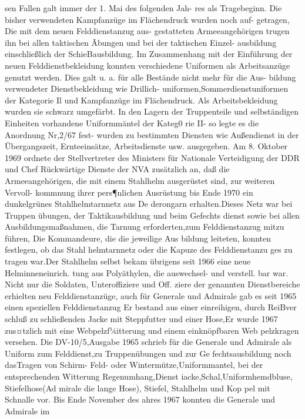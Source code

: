 sen Fallen galt immer der 1. Mai des folgenden Jah-
res als Tragebeginn. Die bisher verwendeten
Kampfanzüge im Flächendruck wurden noch auf-
getragen, Die mit dem neuen Felddienstanzug aus-
gestatteten Armeeangehörigen trugen ihn bei allen
taktischen Ãbungen und bei der taktischen Einzel-
ausbildung einschließlich der SchieBausbildung.
Im Zusammenhang mit der Einführung der
neuen Felddienstbekleidung konnten verschiedene
Uniformen als Arbeitsanzüge genutzt werden. Dies
galt u. a. für alle Bestände nicht mehr für die Aus-
bildung verwendeter Dienstbekleidung wie Drillich-
uniformen,Sommerdienstuniformen der Kategorie Il und Kampfanzüge im Flächendruck. Als
Arbeitsbekleidung wurden sie schwarz umgefärbt.
In den Lagern der Truppenteile und selbständigen
Einheiten vorhandene Uniformmäntel der Kateg0
rie II- so legte es die Anordnung Nr,2/67 fest-
wurden zu bestimmten Diensten wie Außendienst
in der Übergangszeit, Ernteeinsätze, Arbeitsdienste
usw. ausgegeben.
Am 8. Oktober 1969 ordnete der Stellvertreter
des Ministers für Nationale Verteidigung der DDR
und Chef Rückwärtige Dienste der NVA zusätzlich
an, daß die Armeeangehörigen, die mit einem
Stahlhelm ausgerüstet sind, zur weiteren Vervoll-
kommnung ihrer pers¶nlichen Ausrüstung bis Ende 1970 ein dunkelgrünes Stahlhelmtarnnetz aus De
derongarn erhalten.Dieses Netz war bei Truppen
übungen, der Taktikausbildung und beim Gefechts
dienst sowie bei allen Ausbildungsmaßnahmen, die
Tarnung erforderten,zum Felddienstanzug mitzu
führen, Die Kommandeure, die die jeweilige Aus
bildung leiteten, konnten festlegen, ob das Stahl
helmtarnnetz oder die Kapuze des Felddienstanzu
ges zu tragen war.Der Stahlhelm selbst bekam
übrigens seit 1966 eine neue Helminneneinrich.
tung aus Polyäthylen, die auswechsel- und verstell.
bar war.
Nicht nur die Soldaten, Unteroffiziere und Off.
ziere der genannten Dienstbereiche erhielten neu
Felddienstanzüge, auch für Generale und Admirale
gab es seit 1965 einen speziellen Felddienstanzug
Er bestand aus einer einreihigen, durch ReiBver
schluß zu schließenden Jacke mit Steppfutter und
einer Hose,Er wurde 1967 zus¤tzlich mit eine
Webpelzf¼itterung und einem einknöpfbaren Web
pelzkragen versehen. Die DV-10/5,Ausgabe 1965
schrieb für die Generale und Admirale als Uniform
zum Felddienst,zu Truppenübungen und zur Ge
fechtsausbildung noch dasTragen von Schirm-
Feld- oder Wintermütze,Uniformmantel, bei der
entsprechenden Witterung Regenumhang,Dienst
iacke,Schal,Uniformhemdbluse, Stiefelhose(Ad
mirale die lange Hose), Stiefel, Stahlhelm und Kop
pel mit Schnalle vor. Bis Ende November des
ahres 1967 konnten die Generale und Admirale im
